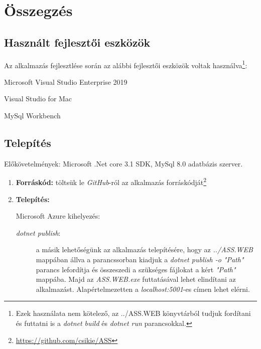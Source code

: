 \chapter{Összegzés} %
\label{ch:sum}
\section{Használt fejlesztői eszközök}
Az alkalmazás fejlesztlése során az alábbi fejlesztői eszközök voltak használva\footnote{Ezek használata nem kötelező, az ../ASS.WEB könyvtárból tudjuk fordítani és futtatni is a \emph{dotnet build} és \emph{dotnet run} parancsokkal.}:
\begin{compactitem}
    \item Microsoft Visual Studio Enterprise 2019
    \item Visual Studio for Mac 
    \item MySql Workbench
\end{compactitem}
\section{Telepítés}
Előkövetelmények: Microsoft .Net core 3.1 SDK, MySql 8.0 adatbázis szerver.
\begin{enumerate}
    \item \textbf{Forráskód:} töltsük le \emph{GitHub}-ról az alkalmazás forráskódját\footnote{\url{https://github.com/csikie/ASS}}
    \item \textbf{Telepítés:}
    \begin{description}
        \item[Microsoft Azure kihelyezés:] \cite{Azure}
        \item[\emph{dotnet publish}:]\label{step:dotnet-publish} a másik lehetőségünk az alkalmazás telepítésére, hogy az \emph{../ASS.WEB} mappában állva a parancssorban kiadjuk a \emph{dotnet publish -o "Path"} parancs lefordítja és összeszedi a szükséges fájlokat a kért \emph{"Path"} mappába. Majd az \emph{ASS.WEB.exe} futtatásával lehet elindítani az alkalmazást. Alapértelmezetten a \emph{localhost:5001}-es címen lehet elérni.
    \end{description}
\end{enumerate}
